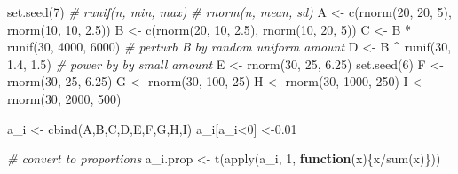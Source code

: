 \documentclass[
  onecolumn]{article}
\newenvironment{Shaded}{\begin{snugshade}}{\end{snugshade}}
\newcommand{\CommentTok}[1]{\textcolor[rgb]{0.56,0.35,0.01}{\textit{#1}}}
\newcommand{\ControlFlowTok}[1]{\textcolor[rgb]{0.13,0.29,0.53}{\textbf{#1}}}
\newcommand{\DecValTok}[1]{\textcolor[rgb]{0.00,0.00,0.81}{#1}}
\newcommand{\FloatTok}[1]{\textcolor[rgb]{0.00,0.00,0.81}{#1}}
\newcommand{\FunctionTok}[1]{\textcolor[rgb]{0.00,0.00,0.00}{#1}}
\newcommand{\NormalTok}[1]{#1}
\newcommand{\OtherTok}[1]{\textcolor[rgb]{0.56,0.35,0.01}{#1}}
\newcommand{\SpecialCharTok}[1]{\textcolor[rgb]{0.00,0.00,0.00}{#1}}
\begin{document}
\begin{Shaded}
\begin{Highlighting}[]
\FunctionTok{set.seed}\NormalTok{(}\DecValTok{7}\NormalTok{)}
\CommentTok{\# runif(n, min, max)}
\CommentTok{\# rnorm(n, mean, sd)}
\NormalTok{A }\OtherTok{\textless{}{-}} \FunctionTok{c}\NormalTok{(}\FunctionTok{rnorm}\NormalTok{(}\DecValTok{20}\NormalTok{, }\DecValTok{20}\NormalTok{, }\DecValTok{5}\NormalTok{), }\FunctionTok{rnorm}\NormalTok{(}\DecValTok{10}\NormalTok{, }\DecValTok{10}\NormalTok{, }\FloatTok{2.5}\NormalTok{))}
\NormalTok{B }\OtherTok{\textless{}{-}} \FunctionTok{c}\NormalTok{(}\FunctionTok{rnorm}\NormalTok{(}\DecValTok{20}\NormalTok{, }\DecValTok{10}\NormalTok{, }\FloatTok{2.5}\NormalTok{), }\FunctionTok{rnorm}\NormalTok{(}\DecValTok{10}\NormalTok{, }\DecValTok{20}\NormalTok{, }\DecValTok{5}\NormalTok{))}
\NormalTok{C }\OtherTok{\textless{}{-}}\NormalTok{ B }\SpecialCharTok{*} \FunctionTok{runif}\NormalTok{(}\DecValTok{30}\NormalTok{, }\DecValTok{4000}\NormalTok{, }\DecValTok{6000}\NormalTok{) }\CommentTok{\# perturb B by random uniform amount}
\NormalTok{D }\OtherTok{\textless{}{-}}\NormalTok{ B }\SpecialCharTok{\^{}} \FunctionTok{runif}\NormalTok{(}\DecValTok{30}\NormalTok{, }\FloatTok{1.4}\NormalTok{, }\FloatTok{1.5}\NormalTok{) }\CommentTok{\# power by by small amount}
\NormalTok{E }\OtherTok{\textless{}{-}} \FunctionTok{rnorm}\NormalTok{(}\DecValTok{30}\NormalTok{, }\DecValTok{25}\NormalTok{, }\FloatTok{6.25}\NormalTok{)}
\FunctionTok{set.seed}\NormalTok{(}\DecValTok{6}\NormalTok{)}
\NormalTok{F }\OtherTok{\textless{}{-}} \FunctionTok{rnorm}\NormalTok{(}\DecValTok{30}\NormalTok{, }\DecValTok{25}\NormalTok{, }\FloatTok{6.25}\NormalTok{)}
\NormalTok{G }\OtherTok{\textless{}{-}} \FunctionTok{rnorm}\NormalTok{(}\DecValTok{30}\NormalTok{, }\DecValTok{100}\NormalTok{, }\DecValTok{25}\NormalTok{)}
\NormalTok{H }\OtherTok{\textless{}{-}} \FunctionTok{rnorm}\NormalTok{(}\DecValTok{30}\NormalTok{, }\DecValTok{1000}\NormalTok{, }\DecValTok{250}\NormalTok{)}
\NormalTok{I }\OtherTok{\textless{}{-}} \FunctionTok{rnorm}\NormalTok{(}\DecValTok{30}\NormalTok{, }\DecValTok{2000}\NormalTok{, }\DecValTok{500}\NormalTok{)}

\NormalTok{a\_i }\OtherTok{\textless{}{-}} \FunctionTok{cbind}\NormalTok{(A,B,C,D,E,F,G,H,I)}
\NormalTok{a\_i[a\_i}\SpecialCharTok{\textless{}}\DecValTok{0}\NormalTok{] }\OtherTok{\textless{}{-}}\FloatTok{0.01}

\CommentTok{\# convert to proportions}
\NormalTok{a\_i.prop }\OtherTok{\textless{}{-}} \FunctionTok{t}\NormalTok{(}\FunctionTok{apply}\NormalTok{(a\_i, }\DecValTok{1}\NormalTok{, }\ControlFlowTok{function}\NormalTok{(x)\{x}\SpecialCharTok{/}\FunctionTok{sum}\NormalTok{(x)\}))}


\end{Highlighting}
\end{Shaded}
\end{document}
